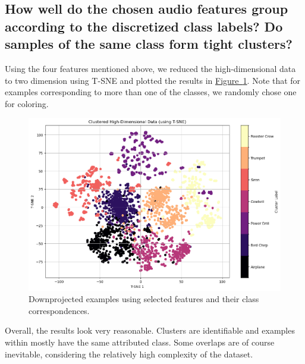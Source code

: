 \subsection{How well do the chosen audio features group according to the discretized class labels? Do samples of the same class form tight clusters?}
\label{sec:Labeling Function:c}
Using the four features mentioned above, we reduced the high-dimensional data to two dimension using T-SNE and plotted the results in \hyperref[fig:1_TSNE]{Figure~\ref*{fig:1_TSNE}}. Note that for examples corresponding to more than one of the classes, we randomly chose one for coloring.

\begin{figure}[htbp]
    \centering
    \includegraphics[width=0.5\linewidth]{figs/1_TSNE.png}
    \caption{Downprojected examples using selected features and their class correspondences.}
    \label{fig:1_TSNE}
\end{figure}

Overall, the results look very reasonable. Clusters are identifiable and examples within mostly have the same attributed class. Some overlaps are of course inevitable, considering the relatively high complexity of the dataset. 
